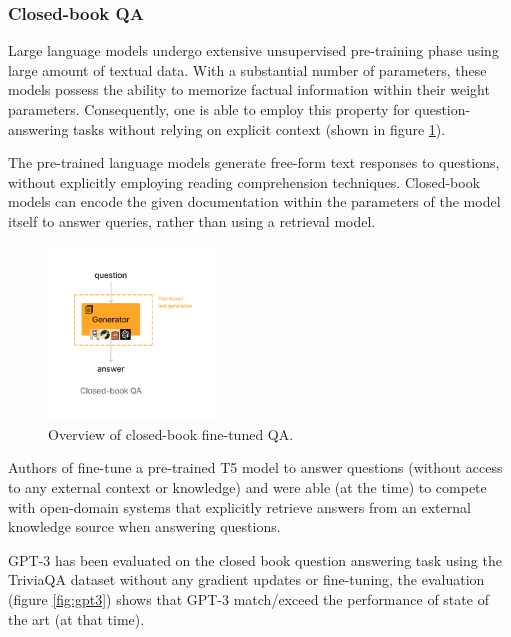 \documentclass[a4paper,12pt]{article}
\begin{document}
\subsubsection{Closed-book QA}
Large language models undergo extensive unsupervised pre-training phase using large amount of textual data. With a substantial number of parameters, these models possess the ability to memorize factual information within their weight parameters. Consequently, one is able to employ this property for question-answering tasks without relying on explicit context (shown in figure \ref{fig:closedbook}). 

The pre-trained language models generate free-form text responses to questions, without explicitly employing reading comprehension techniques.
Closed-book models can encode the given documentation within the parameters of the model itself to answer queries, rather than using a retrieval model.

\begin{figure}
	\begin{center}
		\includegraphics[width=0.4\textwidth]{figures/closedbook.png}
	\end{center}
	\caption{Overview of closed-book fine-tuned QA.}
	\label{fig:closedbook}
\end{figure}

Authors of \cite{T5Qa} fine-tune a pre-trained T5 \cite{T5} model to answer questions
(without access to any external context or knowledge) and were able (at the time) to compete with open-domain systems that
explicitly retrieve answers from an external knowledge source when answering questions.

GPT-3 \cite{gpt3} has been evaluated on the closed book question answering task using the TriviaQA dataset \cite{triviaqa} without any gradient updates or fine-tuning, the evaluation (figure \ref{fig:gpt3}) shows that GPT-3 match/exceed the performance of state of the art (at that time).
\end{document}
